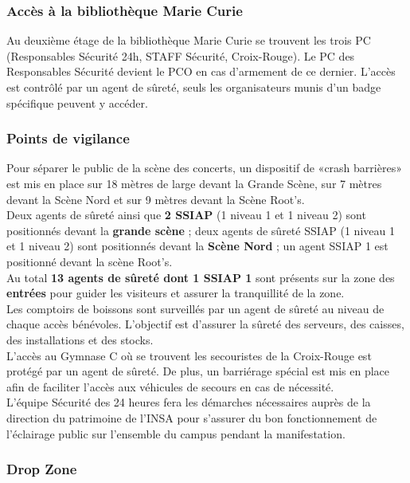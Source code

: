 \documentclass[hidelinks, paper=a4, fontsize=13pt]{report}
\begin{document}
\subsubsection{Accès à la bibliothèque Marie Curie}
Au deuxième étage de la bibliothèque Marie Curie se trouvent les trois PC (Responsables Sécurité 24h, STAFF Sécurité, Croix-Rouge). Le PC des Responsables Sécurité devient le PCO en cas d'armement de ce dernier. L'accès est contrôlé par un agent de sûreté, seuls les organisateurs munis d'un badge spécifique peuvent y accéder.


\subsubsection{Points de vigilance}

Pour séparer le public de la scène des concerts, un dispositif de «crash barrières» est mis en place sur 18 mètres de large devant la Grande Scène, sur 7 mètres devant la Scène Nord et sur 9 mètres devant la Scène Root's. \\

Deux agents de sûreté ainsi que \textbf{2 SSIAP} (1 niveau 1 et 1 niveau 2) sont positionnés devant la \textbf{grande scène} ; deux agents de sûreté SSIAP (1 niveau 1 et 1 niveau 2) sont positionnés devant la \textbf{Scène Nord} ; un agent SSIAP 1 est positionné devant la scène Root's.\\

Au total \textbf{13 agents de sûreté dont 1 SSIAP 1} sont présents sur la zone des \textbf{entrées} pour guider les visiteurs et assurer la tranquillité de la zone.\\

Les comptoirs de boissons sont surveillés par un agent de sûreté au niveau de chaque accès bénévoles. L’objectif est d’assurer la sûreté des serveurs, des caisses, des installations et des stocks.\\

L’accès au Gymnase C où se trouvent les secouristes de la Croix-Rouge est protégé par un agent de sûreté. De plus, un barriérage spécial est mis en place afin de faciliter l’accès aux véhicules de secours en cas de nécessité.\\

L’équipe Sécurité des 24 heures fera les démarches nécessaires auprès de la direction du patrimoine de l’INSA pour s’assurer du bon fonctionnement de l’éclairage public sur l’ensemble du campus pendant la manifestation.


\subsubsection{Drop Zone}
\end{document}
